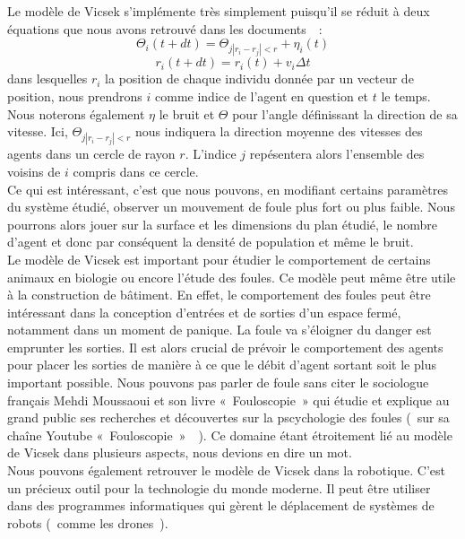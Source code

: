 \documentclass[french, a4paper, 12pt]{article}
\begin{document}
	Le modèle de Vicsek s'implémente très simplement puisqu'il se réduit à deux équations que nous avons retrouvé dans les documents~\cite{vicsek-paper, wiki-model}~:
	\[
		\Theta_{i}(t+dt) = \Theta_{j |r_{i}-r_{j}|<r} + \eta_{i}(t)
	\]
	\[
		r_{i}(t+dt) = r_{i}(t) + v_{i}\Delta t
	\]
	dans lesquelles $r_{i}$ la position de chaque individu donnée par un vecteur de position, nous prendrons $i$ comme indice de l'agent en question et $t$ le temps. Nous noterons également $\eta$ le bruit et $\Theta$ pour l’angle définissant la direction de sa vitesse. Ici, $\Theta_{j |r_{i}-r_{j}|<r}$ nous indiquera la direction moyenne des vitesses des agents dans un cercle de rayon $r$. L'indice $j$ repésentera alors l'ensemble des voisins de $i$ compris dans ce cercle.\\

	Ce qui est intéressant, c'est que nous pouvons, en modifiant certains paramètres du système étudié, observer un mouvement de foule plus fort ou plus faible. Nous pourrons alors jouer sur la surface et les dimensions du plan étudié, le nombre d'agent et donc par conséquent la densité de population et même le bruit.\\

	Le modèle de Vicsek est important pour étudier le comportement de certains animaux en biologie ou encore l'étude des foules. Ce modèle peut même être utile à la construction de bâtiment. En effet, le comportement des foules peut être intéressant dans la conception d'entrées et de sorties d'un espace fermé, notamment dans un moment de panique. La foule va s'éloigner du danger est emprunter les sorties. Il est alors crucial de prévoir le comportement des agents pour placer les sorties de manière à ce que le débit d'agent sortant soit le plus important possible. Nous pouvons pas parler de foule sans citer le sociologue français Mehdi Moussaoui et son livre «~Fouloscopie~» qui étudie et explique au grand public ses recherches et découvertes sur la pscychologie des foules (~sur sa chaîne Youtube «~Fouloscopie~»~\cite{fouloscopie}~). Ce domaine étant étroitement lié au modèle de Vicsek dans plusieurs aspects, nous devions en dire un mot. \\

	Nous pouvons également retrouver le modèle de Vicsek dans la robotique. C'est un précieux outil pour la technologie du monde moderne. Il peut être utiliser dans des programmes informatiques qui gèrent le déplacement de systèmes de robots (~comme les drones~).\\ 
\end{document}
